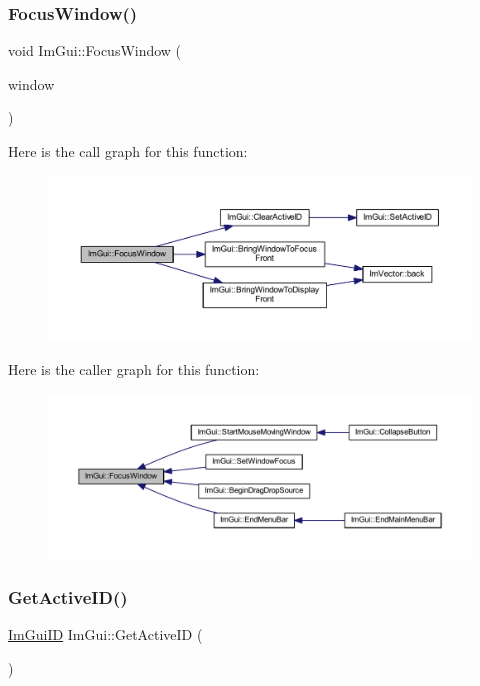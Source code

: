 \subsubsection{\texorpdfstring{Focus\+Window()}{FocusWindow()}}
{\footnotesize\ttfamily void Im\+Gui\+::\+Focus\+Window (\begin{DoxyParamCaption}\item[{\mbox{\hyperlink{struct_im_gui_window}{Im\+Gui\+Window}} $\ast$}]{window }\end{DoxyParamCaption})}

Here is the call graph for this function\+:
\nopagebreak
\begin{figure}[H]
\begin{center}
\leavevmode
\includegraphics[width=350pt]{namespace_im_gui_ade4c08e7e7ad7bbfa4835248f5f3a7c6_cgraph}
\end{center}
\end{figure}
Here is the caller graph for this function\+:
\nopagebreak
\begin{figure}[H]
\begin{center}
\leavevmode
\includegraphics[width=350pt]{namespace_im_gui_ade4c08e7e7ad7bbfa4835248f5f3a7c6_icgraph}
\end{center}
\end{figure}
\mbox{\label{namespace_im_gui_a2577aabfddbb8c092a014cbdcc333204}} 
\subsubsection{\texorpdfstring{Get\+Active\+I\+D()}{GetActiveID()}}
{\footnotesize\ttfamily \mbox{\hyperlink{imgui_8h_a1785c9b6f4e16406764a85f32582236f}{Im\+Gui\+ID}} Im\+Gui\+::\+Get\+Active\+ID (\begin{DoxyParamCaption}{ }\end{DoxyParamCaption})\hspace{0.3cm}{\ttfamily [inline]}}


